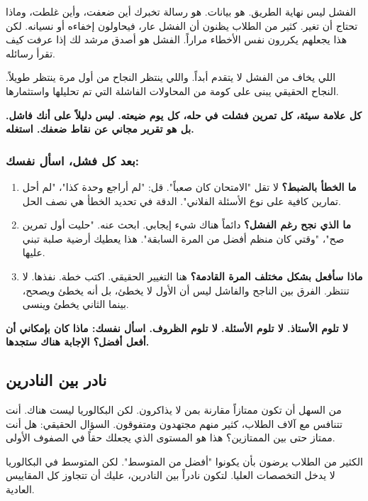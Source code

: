 \documentclass[12pt,a4paper]{book}
\newcommand{\importantAr}[1]{%
	\begin{important}
		\bfseries #1
	\end{important}
}
\begin{document}
	الفشل ليس نهاية الطريق. هو بيانات. هو رسالة تخبرك أين ضعفت، وأين غلطت، وماذا تحتاج أن تغير. كثير من الطلاب يظنون أن الفشل عار، فيحاولون إخفاءه أو نسيانه. لكن هذا يجعلهم يكررون نفس الأخطاء مراراً. الفشل هو أصدق مرشد لك إذا عرفت كيف تقرأ رسائله.
	
	اللي يخاف من الفشل لا يتقدم أبداً. واللي ينتظر النجاح من أول مرة ينتظر طويلاً. النجاح الحقيقي يبنى على كومة من المحاولات الفاشلة التي تم تحليلها واستثمارها.
	
	\importantAr{كل علامة سيئة، كل تمرين فشلت في حله، كل يوم ضيعته. ليس دليلاً على أنك فاشل. بل هو تقرير مجاني عن نقاط ضعفك. استغله.}
	
	\subsubsection*{بعد كل فشل، اسأل نفسك:}
	
	\begin{enumerate}
		\item \textbf{ما الخطأ بالضبط؟} لا تقل "الامتحان كان صعباً". قل: "لم أراجع وحدة كذا"، "لم أحل تمارين كافية على نوع الأسئلة الفلاني". الدقة في تحديد الخطأ هي نصف الحل.
		\item \textbf{ما الذي نجح رغم الفشل؟} دائماً هناك شيء إيجابي. ابحث عنه. "حليت أول تمرين صح"، "وقتي كان منظم أفضل من المرة السابقة". هذا يعطيك أرضية صلبة تبني عليها.
		\item \textbf{ماذا سأفعل بشكل مختلف المرة القادمة؟} هنا التغيير الحقيقي. اكتب خطة. نفذها. لا تنتظر. الفرق بين الناجح والفاشل ليس أن الأول لا يخطئ، بل أنه يخطئ ويصحح، بينما الثاني يخطئ وينسى.
	\end{enumerate}
	
	\importantAr{لا تلوم الأستاذ. لا تلوم الأسئلة. لا تلوم الظروف. اسأل نفسك: ماذا كان بإمكاني أن أفعل أفضل؟ الإجابة هناك ستجدها.}
	
	\subsection{نادر بين النادرين}
	\label{subsec:uncommon-amongst-uncommon}
	
	من السهل أن تكون ممتازاً مقارنة بمن لا يذاكرون. لكن البكالوريا ليست هناك. أنت تتنافس مع آلاف الطلاب، كثير منهم مجتهدون ومتفوقون. السؤال الحقيقي: هل أنت ممتاز حتى بين الممتازين؟ هذا هو المستوى الذي يجعلك حقاً في الصفوف الأولى.
	
	الكثير من الطلاب يرضون بأن يكونوا "أفضل من المتوسط". لكن المتوسط في البكالوريا لا يدخل التخصصات العليا. لتكون نادراً بين النادرين، عليك أن تتجاوز كل المقاييس العادية.
	
\end{document}
